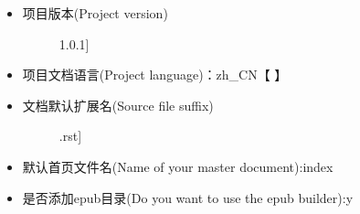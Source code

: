 \documentclass[a4paper,10pt,english]{sphinxmanual}
\begin{document}
\begin{description}
\begin{itemize}
\begin{description}
\end{description}

\item {} \begin{description}
\item[{项目版本(Project version)}] \leavevmode{[}1.0.1{]}
\begin{figure}[htbp]
\centering

\noindent{}
\end{figure}

\end{description}

\item {} \begin{description}
\item[{项目文档语言(Project language)：zh\_CN【  】}] \leavevmode
\begin{figure}[htbp]
\centering

\noindent{}
\end{figure}

\end{description}

\item {} \begin{description}
\item[{文档默认扩展名(Source file suffix)}] \leavevmode{[}.rst{]}
\begin{figure}[htbp]
\centering

\noindent{}
\end{figure}

\end{description}

\item {} \begin{description}
\item[{默认首页文件名(Name of your master document):index}] \leavevmode
\begin{figure}[htbp]
\centering

\noindent{}
\end{figure}

\end{description}

\item {} \begin{description}
\item[{是否添加epub目录(Do you want to use the epub builder):y}] \leavevmode
\begin{figure}[htbp]
\centering


\end{figure}
\end{description}
\end{itemize}
\end{description}
\end{document}
